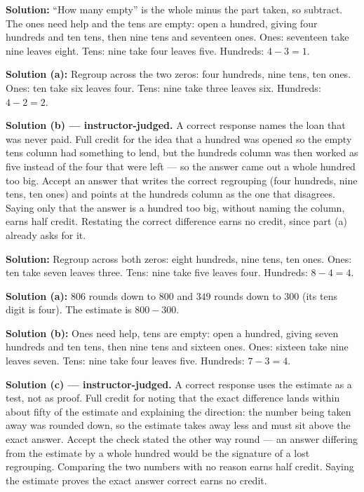 \documentclass[12pt]{article}
\begin{document}

\textbf{Solution:} ``How many empty'' is the whole minus the part taken, so subtract. The ones need help and the tens are empty: open a hundred, giving four hundreds and ten tens, then nine tens and seventeen ones. Ones: seventeen take nine leaves eight. Tens: nine take four leaves five. Hundreds: $4 - 3 = 1$. 


\textbf{Solution (a):} Regroup across the two zeros: four hundreds, nine tens, ten ones. Ones: ten take six leaves four. Tens: nine take three leaves six. Hundreds: $4 - 2 = 2$. 

\textbf{Solution (b) --- instructor-judged.} A correct response names the loan that was never paid. Full credit for the idea that a hundred was opened so the empty tens column had something to lend, but the hundreds column was then worked as five instead of the four that were left --- so the answer came out a whole hundred too big. Accept an answer that writes the correct regrouping (four hundreds, nine tens, ten ones) and points at the hundreds column as the one that disagrees. Saying only that the answer is a hundred too big, without naming the column, earns half credit. Restating the correct difference earns no credit, since part (a) already asks for it.


\textbf{Solution:} Regroup across both zeros: eight hundreds, nine tens, ten ones. Ones: ten take seven leaves three. Tens: nine take five leaves four. Hundreds: $8 - 4 = 4$. 


\textbf{Solution (a):} $806$ rounds down to $800$ and $349$ rounds down to $300$ (its tens digit is four). The estimate is $800 - 300$. 

\textbf{Solution (b):} Ones need help, tens are empty: open a hundred, giving seven hundreds and ten tens, then nine tens and sixteen ones. Ones: sixteen take nine leaves seven. Tens: nine take four leaves five. Hundreds: $7 - 3 = 4$. 

\textbf{Solution (c) --- instructor-judged.} A correct response uses the estimate as a test, not as proof. Full credit for noting that the exact difference lands within about fifty of the estimate and explaining the direction: the number being taken away was rounded down, so the estimate takes away less and must sit above the exact answer. Accept the check stated the other way round --- an answer differing from the estimate by a whole hundred would be the signature of a lost regrouping. Comparing the two numbers with no reason earns half credit. Saying the estimate proves the exact answer correct earns no credit.
\end{document}
